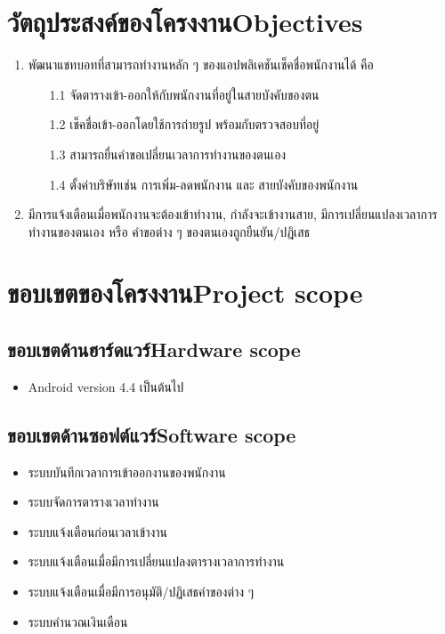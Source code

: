 \section{\ifcpe วัตถุประสงค์ของโครงงาน\else Objectives\fi}
\begin{enumerate}
    \item พัฒนาแชทบอทที่สามารถทำงานหลัก ๆ ของแอปพลิเคชันเช็คชื่อพนักงานได้ คือ 
    \begin{enumerate}
    \item[1.1] จัดตารางเข้า-ออกให้กับพนักงานที่อยู่ในสายบังคับของตน
    \item[1.2] เช็คชื่อเข้า-ออกโดยใช้การถ่ายรูป พร้อมกับตรวจสอบที่อยู่ 
    \item[1.3] สามารถยื่นคำขอเปลี่ยนเวลาการทำงานของตนเอง
    \item[1.4] ตั้งค่าบริษัทเช่น การเพิ่ม-ลดพนักงาน และ สายบังคับของพนักงาน 
    \end{enumerate} 
    \item มีการแจ้งเตือนเมื่อพนักงานจะต้องเข้าทำงาน, กำลังจะเข้างานสาย, มีการเปลี่ยนแปลงเวลาการทำงานของตนเอง หรือ คำขอต่าง ๆ ของตนเองถูกยืนยัน/ปฎิเสธ
\end{enumerate}

\section{\ifcpe ขอบเขตของโครงงาน\else Project scope\fi}

\subsection{\ifcpe ขอบเขตด้านฮาร์ดแวร์\else Hardware scope\fi}
\begin{itemize}
    \item Android version 4.4 เป็นต้นไป
\end{itemize}

\subsection{\ifcpe ขอบเขตด้านซอฟต์แวร์\else Software scope\fi}
\begin{itemize}
    \item ระบบบันทึกเวลาการเข้าออกงานของพนักงาน
    \item ระบบจัดการตารางเวลาทำงาน 
    \item ระบบแจ้งเตือนก่อนเวลาเข้างาน
    \item ระบบแจ้งเตือนเมื่อมีการเปลี่ยนแปลงตารางเวลาการทำงาน
    \item ระบบแจ้งเตือนเมื่อมีการอนุมัติ/ปฏิเสธคำของต่าง ๆ
    \item ระบบคำนวณเงินเดือน
\end{itemize}

